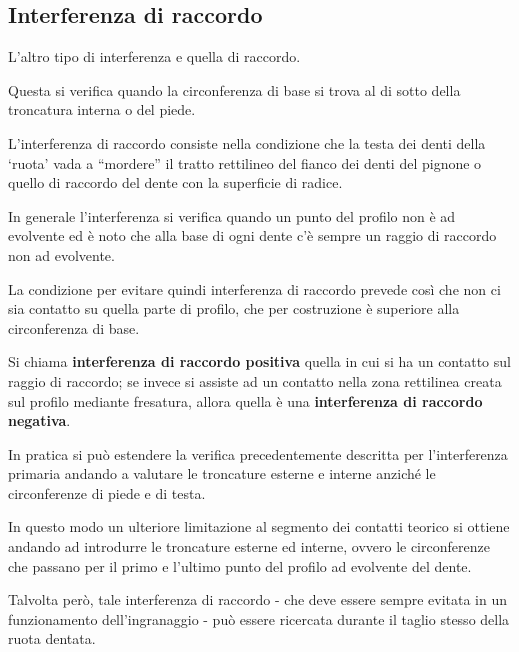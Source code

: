 \documentclass[a4paper, 15pt]{article}
\begin{document}
\subsection{Interferenza di raccordo}		
\begin{adjustwidth}{2in}{}
		L'altro tipo di interferenza e quella di raccordo. 
		
		Questa si verifica quando la circonferenza di base si trova al di sotto della troncatura interna o del piede. \newline
		
		L’interferenza di raccordo consiste nella condizione che la testa dei denti della ‘ruota’ vada a “mordere” il tratto
		rettilineo del fianco dei denti del pignone o quello di raccordo del dente con la superficie di radice. \newline
		
		In generale l'interferenza si verifica quando un punto del profilo non è ad evolvente ed è noto che alla base di ogni dente c'è sempre un raggio di raccordo non ad evolvente.
		
		La condizione per evitare quindi interferenza di raccordo prevede così che non ci sia contatto su quella parte di profilo, che per costruzione è superiore alla circonferenza di base.
		
		Si chiama \textbf{interferenza di raccordo positiva} quella in cui si ha un contatto sul raggio di raccordo; se invece si assiste ad un contatto nella zona rettilinea creata sul profilo mediante fresatura, allora quella è una \textbf{interferenza di raccordo negativa}. \newline 
		
		In pratica si può estendere la verifica precedentemente descritta per l'interferenza primaria andando a valutare le troncature esterne e interne anziché le circonferenze di piede e di testa. 
		
		In questo modo un ulteriore limitazione al segmento dei contatti teorico si ottiene andando ad introdurre le troncature esterne ed interne, ovvero le circonferenze che passano per il primo e l'ultimo punto del profilo ad evolvente del dente. \newline
		
		Talvolta però, tale interferenza di raccordo  - che deve essere sempre evitata in un funzionamento dell'ingranaggio - può essere ricercata durante il taglio stesso della ruota dentata. 
		

\end{adjustwidth}
\end{document}
